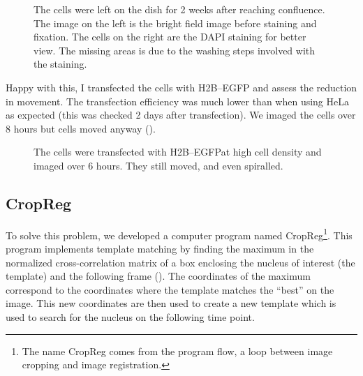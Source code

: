     \begin{figure}
      \centering
                   {The cells were left on the dish for 2 weeks after reaching confluence. The
                    image on the left is the bright field image before staining and fixation.
                    The cells on the right are the DAPI staining for better view. The missing
                    areas is due to the washing steps involved with the staining.}
      \label{fig:healthy-horse}
    \end{figure}
    
    Happy with this, I transfected the cells with H2B--EGFP and assess the reduction in movement.
    The transfection efficiency was much lower than when using HeLa as expected (this was checked 2 days
    after transfection). We imaged the cells over 8 hours but cells moved anyway ().
    
    \begin{figure}
      \centering
                   {The cells were transfected with H2B--EGFPat high cell density and
                    imaged over 6 hours. They still moved, and even spiralled.}
      \label{fig:horse-moving}
    \end{figure}

  \subsection{CropReg}
  
    To solve this problem, we developed a computer program named CropReg\footnote{The name CropReg
    comes from the program flow, a loop between image cropping and image registration.}. This
    program implements template matching by
    finding the maximum in the normalized cross-correlation matrix of a
    box enclosing the nucleus of interest (the template) and the following frame (). The
    coordinates of the maximum correspond to the coordinates where the template matches the ``best'' on the
    image. This new coordinates are then used to create a new template which is used to search for the nucleus
    on the following time point.
    
